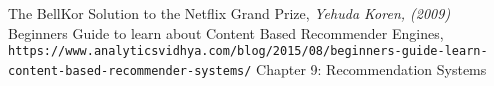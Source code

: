 \documentclass[11pt]{article}
\begin{document}
\begin{thebibliography}{9}
The BellKor Solution to the Netflix Grand Prize,
\textit{Yehuda Koren, (2009)}
Beginners Guide to learn about Content Based Recommender Engines,
\\\texttt{https://www.analyticsvidhya.com/blog/2015/08/beginners-guide-learn-content-based-recommender-systems/}
Chapter 9: Recommendation Systems
\end{thebibliography}
\end{document}
